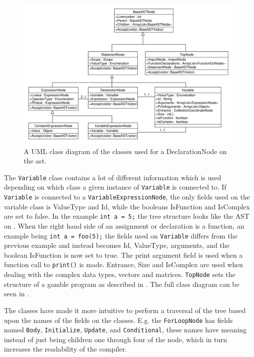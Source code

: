\begin{figure}[!ht]
\centering
 \includegraphics[width=1\textwidth]{figures/ClassDiagrams/ASTDeclarationNodeMoreInfo.pdf} %
\caption{A UML class diagram of the classes used for a DeclarationNode on the \acrshort{ast}.}\label{image:ASTDecl}
\vspace{-15pt}
\end{figure}

The \texttt{Variable} class contains a lot of different information which is used depending on which class a given instance of \texttt{Variable} is connected to.
If \texttt{Variable} is connected to a \texttt{VariableExpressionNode}, the only fields used on the variable class is ValueType and Id, while the booleans IsFunction and IsComplex are set to false.
In the example \texttt{int a = 5;} the tree structure looks like the AST on .
When the right hand side of an assignment or declaration is a function, an example being \texttt{int a = foo(5);} the fields used on \texttt{Variable} differs from the previous example and instead becomes Id, ValueType, arguments, and the boolean IsFunction is now set to true.
The print argument field is used when a function call to \texttt{print()} is made. 
Entrance, Size and IsComplex are used when dealing with the complex data types, vectors and matrices.
\texttt{TopNode} sets the structure of a \gls{gamble} program as described in .
The full class diagram can be seen in .

The classes have made it more intuitive to perform a traversal of the tree based upon the names of the fields on the classes.
E.g. the \texttt{ForLoopNode} has fields named \texttt{Body}, \texttt{Initialize}, \texttt{Update}, and \texttt{Conditional}, these names have meaning instead of just being children one through four of the node, which in turn increases the readability of the compiler.

